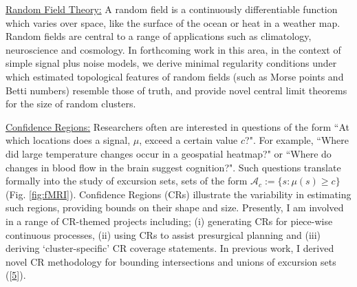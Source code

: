 \documentclass{friggeri-cv}
\begin{document}
\underline{Random Field Theory:} A random field is a continuously differentiable function which varies over space, like the surface of the ocean or heat in a weather map. Random fields are central to a range of applications such as climatology, neuroscience and cosmology. In forthcoming work in this area, in the context of simple signal plus noise models, we derive minimal regularity conditions under which estimated topological features of random fields (such as Morse points and Betti numbers) resemble those of truth, and provide novel central limit theorems for the size of random clusters.

\underline{Confidence Regions:} Researchers often are interested in questions of the form ``At which locations does a signal, $\mu$, exceed a certain value $c$?". For example, ``Where did large temperature changes occur in a geospatial heatmap?" or ``Where do changes in blood flow in the brain suggest cognition?". Such questions translate formally into the study of excursion sets, sets of the form $\mathcal{A}_c:=\{s:\mu(s)\geq c\}$ (Fig. \ref{fig:fMRI}). Confidence Regions (CRs) illustrate the variability in estimating such regions, providing bounds on their shape and size. Presently, I am involved in a range of CR-themed projects including; (i) generating CRs for piece-wise continuous processes, (ii) using CRs to assist presurgical planning and (iii) deriving `cluster-specific' CR coverage statements. In previous work, I derived novel CR methodology for bounding intersections and unions of excursion sets ([\href{https://doi.org/10.1093/jrsssb/qkad104}{5}]).

\newpage
{}
\end{document}
